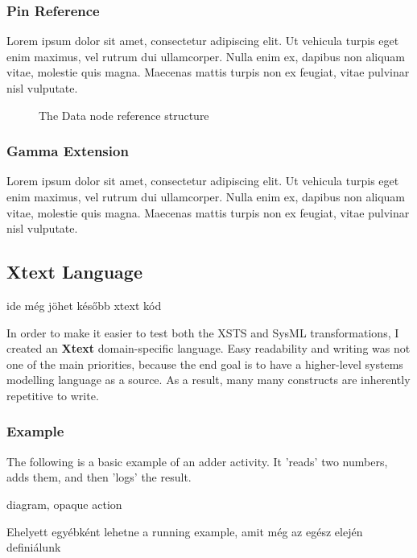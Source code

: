 \subsubsection*{Pin Reference}

Lorem ipsum dolor sit amet, consectetur adipiscing elit. Ut vehicula turpis eget enim maximus, vel rutrum dui ullamcorper. Nulla enim ex, dapibus non aliquam vitae, molestie quis magna. Maecenas mattis turpis non ex feugiat, vitae pulvinar nisl vulputate.

\begin{figure}[!ht]
	\centering
	
	\caption{The Data node reference structure}
	\label{fig:pin_reference}
\end{figure}

\subsubsection*{Gamma Extension}

Lorem ipsum dolor sit amet, consectetur adipiscing elit. Ut vehicula turpis eget enim maximus, vel rutrum dui ullamcorper. Nulla enim ex, dapibus non aliquam vitae, molestie quis magna. Maecenas mattis turpis non ex feugiat, vitae pulvinar nisl vulputate.

\subsection{Xtext Language}

ide még jöhet később xtext kód

In order to make it easier to test both the XSTS and SysML transformations, I created an \textbf{Xtext} domain-specific language. Easy readability and writing was not one of the main priorities, because the end goal is to have a higher-level systems modelling language as a source. As a result, many many constructs are inherently repetitive to write.

\subsubsection*{Example}

The following is a basic example of an adder activity.
It 'reads' two numbers, adds them, and then 'logs' the result.

diagram, opaque action

Ehelyett egyébként lehetne a running example, amit még az egész elején definiálunk


